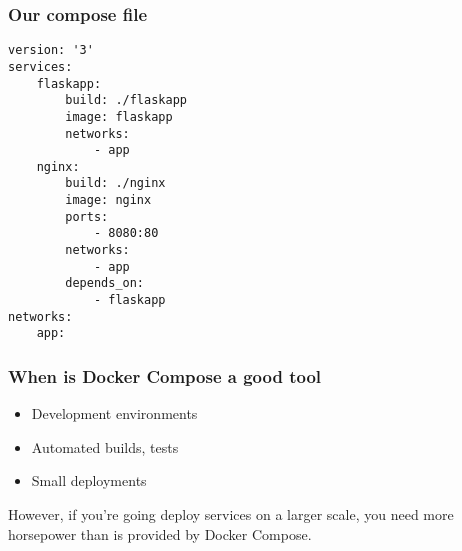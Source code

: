 \documentclass[10pt]{beamer}
\begin{document}
\begin{frame}[fragile]
    \frametitle{Our compose file}
    
    \begin{verbatim}
version: '3'
services:
    flaskapp:
        build: ./flaskapp
        image: flaskapp
        networks:
            - app
    nginx:
        build: ./nginx
        image: nginx
        ports:
            - 8080:80
        networks:
            - app
        depends_on:
            - flaskapp
networks:
    app:
    \end{verbatim}
\end{frame}

\begin{frame}
  \frametitle{When is Docker Compose a good tool}
   
   \begin{itemize}
     \item Development environments    
     \item Automated builds, tests
     \item Small deployments
   \end{itemize}
   
 However, if you're going deploy services on a larger scale, you need more horsepower than is provided by Docker Compose.

\end{frame}
\end{document}
